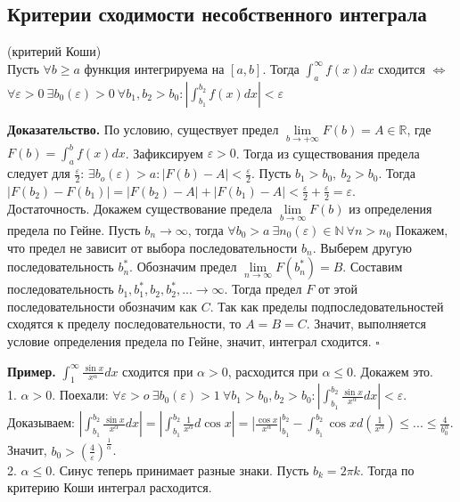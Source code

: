 \subsection{Критерии сходимости несобственного интеграла}
\begin{theor} (критерий Коши)\\
    Пусть $\forall b\geqslant a$ функция интегрируема на $[a,b]$. 
    Тогда $\int_a^\infty f(x)dx$ сходится $\Leftrightarrow$ $\forall 
    \varepsilon>0~\exists b_0(\varepsilon)>0~\forall b_1,b_2>b_0:
    \left| \int_{b_1}^{b_2}f(x)dx \right|<\varepsilon$
\end{theor}
\textbf{Доказательство.} По условию, существует предел 
$\lim\limits_{b \to +\infty} F(b)=A\in \mathbb{R}$, где
$F(b)=\int^b_af(x)dx$. 
Зафиксируем $\varepsilon>0$. Тогда из существования предела следует
для $\frac{\varepsilon}{2}$: $\exists b_o(\varepsilon)>a:\left| 
F(b)-A\right|<\frac{\varepsilon}{2}$. Пусть $b_1>b_0,~b_2>b_0$. Тогда
$|F(b_2)-F(b_1)|=|F(b_2)-A|+|F(b_1)-A|<\frac{\varepsilon}{2}+
\frac{\varepsilon}{2}=\varepsilon$.\\
Достаточность. Докажем существование предела  $\lim\limits_{b\to\infty}F(b)$
из определения предела по Гейне. Пусть $b_n\to \infty$, тогда $\forall b_0>a
~\exists n_0(\varepsilon)\in \mathbb{N}~\forall n>n_0$ 
Покажем, что предел не зависит от выбора последовательности $b_n$. 
Выберем другую последовательность  $b^*_n$. Обозначим предел 
$\lim\limits_{n \to \infty} F(b^*_n)=B$. Составим последовательность
$b_1,b^*_1,b_2,b^*_2,...\to \infty$. Тогда предел $F$ от этой
последовательности обозначим как  $C$. Так как пределы подпоследовательностей 
сходятся к пределу последовательности, то  $A=B=C$. Значит, выполняется
условие определения предела по Гейне, значит, интеграл сходится. $\square$

\textbf{Пример.} $\int_1^\infty \frac{\sin x}{x^\alpha}dx$ сходится при 
$\alpha>0$, расходится при $\alpha\leqslant 0$. Докажем это.\\
1. $\alpha>0$. Поехали: $\forall \varepsilon>o~\exists b_0(\varepsilon)>1~
\forall b_1>b_0,b_2>b_0: \left| \int^{b_2}_{b_1} \frac{\sin x}{x^\alpha}dx
\right|<\varepsilon$. Доказываем: 
$\left| \int^{b_2}_{b_1} \frac{\sin x}{x^\alpha}dx
\right|=\left| \int^{b_2}_{b_1} \frac{1}{x^\alpha}d\cos x\right|=
\left| \frac{\cos x}{x^\alpha} \right|^{b_2}_{b_1}-\int^{b_2}_{b_1} 
\cos x d(\frac{1}{x^\alpha})\leqslant ... \leqslant\frac{4}{b^\alpha_0}$.
Значит, $b_0>(\frac{4}{\varepsilon})^\frac{1}{\alpha}$.\\
2. $\alpha\leqslant 0$. Синус теперь принимает разные знаки. Пусть 
$b_k=2\pi k$. Тогда по критерию Коши интеграл расходится.

